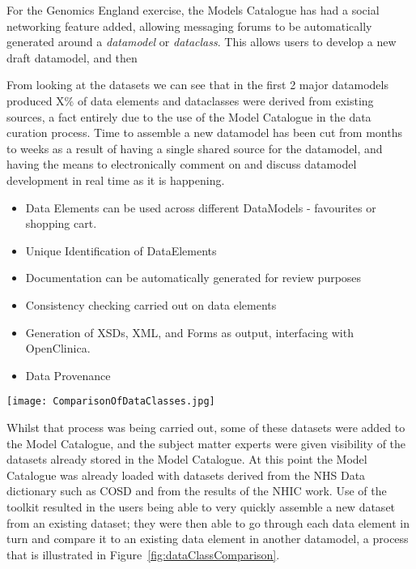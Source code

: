 For the Genomics England exercise, the Models Catalogue has had a
social networking feature added, allowing messaging forums to be
automatically generated around a \emph{datamodel} or
\emph{dataclass}. This allows users to develop a new draft datamodel,
and then

From looking at the datasets we can see that in the first 2 major
datamodels produced X\% of data elements and dataclasses were derived
from existing sources, a fact entirely due to the use of the Model
Catalogue in the data curation process. Time to assemble a new
datamodel has been cut from months to weeks as a result of having a
single shared source for the datamodel, and having the means to
electronically comment on and discuss datamodel development in real
time as it is happening.

\begin{itemize}
	\item Data Elements can be used across different DataModels - favourites or shopping cart.
	\item Unique Identification of DataElements 
	\item Documentation can be automatically generated for review purposes
	\item Consistency checking carried out on data elements
	\item Generation of XSDs, XML, and Forms as output, interfacing with OpenClinica.
	\item Data Provenance
\end{itemize}
\lipsum[1-2]
\begin{figure*}  
	\texttt{[image: ComparisonOfDataClasses.jpg]}
	\caption{Screen Shot of DataClass Comparison} 
	\label{fig:dataClassComparison}	
\end{figure*}
\lipsum[3-4]
Whilst that process was being carried out, some of these datasets were added to the Model Catalogue, and the subject matter experts were given visibility of the datasets already stored in the Model Catalogue. At this point the Model Catalogue was already loaded with datasets derived from the NHS Data dictionary such as COSD and from the results of the NHIC work. Use of the toolkit resulted in the users being able to very quickly assemble a new dataset from an existing dataset; they were then able to go through each data element in turn and compare it to an existing data element in another datamodel, a process that is illustrated in Figure~\ref{fig:dataClassComparison}.


